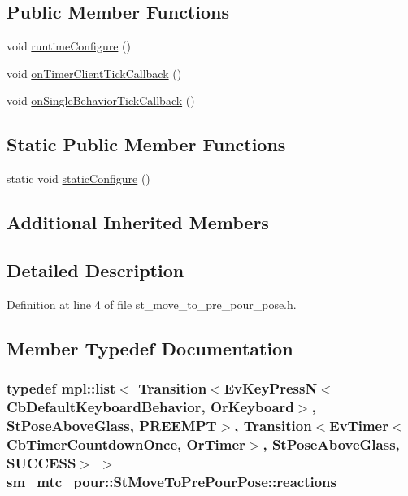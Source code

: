 \subsection*{Public Member Functions}
\begin{DoxyCompactItemize}
\item 
void \hyperlink{structsm__mtc__pour_1_1StMoveToPrePourPose_ab2e66d8e376cef9c7df3f3438ca8c05c}{runtime\+Configure} ()
\item 
void \hyperlink{structsm__mtc__pour_1_1StMoveToPrePourPose_aaf1ab768820b3dd818fc134b18deecd0}{on\+Timer\+Client\+Tick\+Callback} ()
\item 
void \hyperlink{structsm__mtc__pour_1_1StMoveToPrePourPose_af4876bc120a0b3e3d564488958490f80}{on\+Single\+Behavior\+Tick\+Callback} ()
\end{DoxyCompactItemize}
\subsection*{Static Public Member Functions}
\begin{DoxyCompactItemize}
\item 
static void \hyperlink{structsm__mtc__pour_1_1StMoveToPrePourPose_afee77454d3a0a99cec7b4c6d4070b175}{static\+Configure} ()
\end{DoxyCompactItemize}
\subsection*{Additional Inherited Members}


\subsection{Detailed Description}


Definition at line 4 of file st\+\_\+move\+\_\+to\+\_\+pre\+\_\+pour\+\_\+pose.\+h.



\subsection{Member Typedef Documentation}
\subsubsection[{\texorpdfstring{reactions}{reactions}}]{\setlength{\rightskip}{0pt plus 5cm}typedef mpl\+::list$<$ Transition$<$Ev\+Key\+PressN$<$Cb\+Default\+Keyboard\+Behavior, {\bf Or\+Keyboard}$>$, {\bf St\+Pose\+Above\+Glass}, {\bf P\+R\+E\+E\+M\+PT}$>$, Transition$<$Ev\+Timer$<$Cb\+Timer\+Countdown\+Once, {\bf Or\+Timer}$>$, {\bf St\+Pose\+Above\+Glass}, {\bf S\+U\+C\+C\+E\+SS}$>$ $>$ {\bf sm\+\_\+mtc\+\_\+pour\+::\+St\+Move\+To\+Pre\+Pour\+Pose\+::reactions}}\hypertarget{structsm__mtc__pour_1_1StMoveToPrePourPose_a2bb0dd2b99dd3c367f0d7a731647ebb3}{}\label{structsm__mtc__pour_1_1StMoveToPrePourPose_a2bb0dd2b99dd3c367f0d7a731647ebb3}



